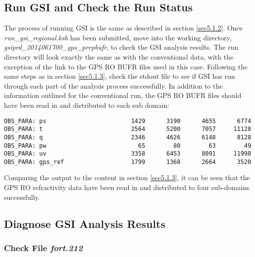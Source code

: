 \subsection{Run GSI and Check the Run Status}

The process of running GSI is the same as described in section \ref{sec5.1.2}.  Once \textit{run\_gsi\_regional.ksh} has been submitted, move into the working directory, \textit{gsiprd\_2014061700\_gps\_prepbufr}, to check the GSI analysis results.  The run directory will look exactly the same as with the conventional data, with the exception of the link to the GPS RO BUFR files used in this case. Following the same steps as in section \ref{sec5.1.3}, check the stdout file to see if GSI has run through each part of the analysis process successfully.  In addition to the information outlined for the conventional run, the GPS RO BUFR files should have been read in and distributed to each sub domain:

\begin{scriptsize}
\begin{verbatim}
OBS_PARA: ps                        1429      3190      4655      6774
OBS_PARA: t                         2564      5200      7057     11128
OBS_PARA: q                         2346      4626      6148      8128
OBS_PARA: pw                          65        80        63        49
OBS_PARA: uv                        3358      6453      8091     11998
OBS_PARA: gps_ref                   1799      1368      2664      3520
\end{verbatim}
\end{scriptsize}

Comparing the output to the content in section \ref{sec5.1.3}, it can be seen that the GPS RO refractivity data have been read in and distributed to four sub-domains successfully.

\subsection{Diagnose GSI Analysis Results}

\subsubsection{Check File \textit{fort.212}}

